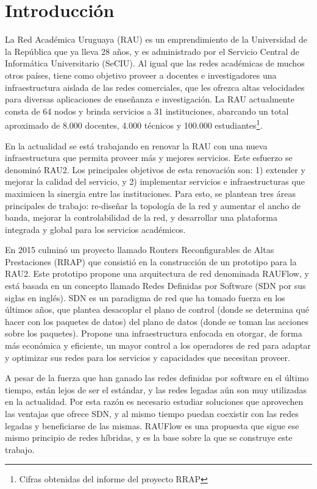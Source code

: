 \chapter{Introducción}
La Red Académica Uruguaya (RAU) es un emprendimiento de la Universidad de la República que ya lleva 28 años, y es administrado por el Servicio Central de Informática Universitario (SeCIU). Al igual que las redes académicas de muchos otros países, tiene como objetivo proveer a docentes e investigadores una infraestructura aislada de las redes comerciales, que les ofrezca altas velocidades para diversas aplicaciones de enseñanza e investigación. La RAU actualmente consta de 64 nodos y brinda servicios a 31 instituciones, abarcando un total aproximado de 8.000 docentes, 4.000 técnicos y 100.000 estudiantes\footnote{Cifras obtenidas del informe del proyecto RRAP}.

En la actualidad se está trabajando en renovar la RAU con una nueva infraestructura que permita proveer más y mejores servicios. Este esfuerzo se denominó RAU2. Los principales objetivos de esta renovación son: 1) extender y mejorar la calidad del servicio, y 2) implementar servicios e infraestructuras que maximicen la sinergia entre las instituciones. Para esto, se plantean tres áreas principales de trabajo: re-diseñar la topología de la red y aumentar el ancho de banda, mejorar la controlabilidad de la red, y desarrollar una plataforma integrada y global para los servicios académicos.

En 2015 culminó un proyecto llamado Routers Reconfigurables de Altas Prestaciones (RRAP) \cite{proyecto-rrap} que consistió en la construcción de un prototipo para la RAU2. Este prototipo propone una arquitectura de red denominada RAUFlow, y está basada en un concepto llamado Redes Definidas por Software (SDN por sus siglas en inglés). SDN es un paradigma de red que ha tomado fuerza en los últimos años, que plantea desacoplar el plano de control (donde se determina qué hacer con los paquetes de datos) del plano de datos (donde se toman las acciones sobre los paquetes). Propone una infraestructura enfocada en otorgar, de forma más económica y eficiente, un mayor control a los operadores de red para adaptar y optimizar sus redes para los servicios y capacidades que necesitan proveer.

A pesar de la fuerza que han ganado las redes definidas por software en el último tiempo, están lejos de ser el estándar, y las redes legadas aún son muy utilizadas en la actualidad. Por esta razón es necesario estudiar soluciones que aprovechen las ventajas que ofrece SDN, y al mismo tiempo puedan coexistir con las redes legadas y beneficiarse de las mismas. RAUFlow es una propuesta que sigue ese mismo principio de redes híbridas, y es la base sobre la que se construye este trabajo.
\graphicspath{{Chapter1/Figs/}}

